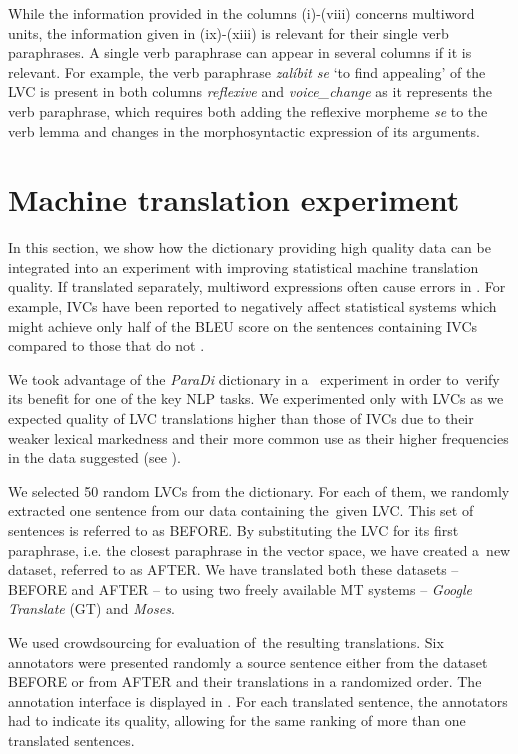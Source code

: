 \documentclass[output=paper,modfonts,nonflat]{langsci/langscibook}
\begin{document}
While the information provided in the columns (i)-(viii) concerns multiword units, 
the information given in (ix)-(xiii) is relevant for their single verb paraphrases.
A single verb paraphrase can appear in several columns if it is relevant. For example, 
the verb paraphrase \textit{zalíbit se} `to find appealing' of the LVC  is present in both columns 
\emph{reflexive} and \emph{voice\_change} as it represents the verb paraphrase,  
which requires both adding the reflexive morpheme \textit{se} to the verb lemma and 
changes in the morphosyntactic expression of its arguments.

\section{Machine translation experiment}
\label{evaluation}
In this section, we show how the dictionary providing high quality data 
can be integrated into an experiment with improving statistical machine 
translation quality. 
If translated separately, multiword expressions often cause errors in 
. For example, IVCs have been reported to negatively affect 
statistical  systems which might achieve only half of the 
BLEU score \citep{Papineni:2002} on the sentences containing IVCs compared to 
those that do not \citep{SaltonRK14}. 

We took advantage of the \emph{ParaDi} dictionary 
in a~ experiment in order to~verify its benefit for one of 
the key NLP tasks. We experimented only with LVCs as we expected quality 
of LVC translations higher than those of IVCs due to their weaker lexical 
markedness and their more common use as their higher frequencies in the data suggested (see ).

We selected 50 random LVCs from the dictionary. For each of them, we 
randomly extracted one sentence from our data containing the~given LVC. This set 
of sentences is referred to as BEFORE. By substituting the LVC for its first 
paraphrase, i.e. the closest paraphrase in the vector space, we have created 
a~new dataset, referred to as AFTER. We have translated both these datasets -- 
BEFORE and AFTER -- to  using two freely available MT systems -- 
\textit{Google Translate} (GT) and 
\textit{Moses}.

We used crowdsourcing for evaluation of~the resulting translations. Six 
annotators were presented randomly a  source sentence either from the 
dataset BEFORE or from AFTER and their  translations in a 
randomized order. The annotation interface is displayed in . 
For each translated sentence, the annotators had to indicate its quality, 
allowing for the same ranking of more than one translated sentences.
\end{document}
